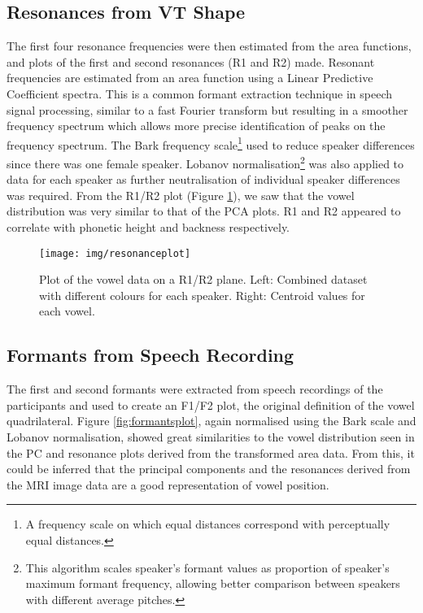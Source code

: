 \subsection{Resonances from VT Shape}

The first four resonance frequencies were then estimated from the area functions, and plots of the first and second resonances (R1 and R2) made. Resonant frequencies are estimated from an area function using a Linear Predictive Coefficient spectra. This is a common formant extraction technique in speech signal processing, similar to a fast Fourier transform but resulting in a smoother frequency spectrum which allows more precise identification of peaks on the frequency spectrum. The Bark frequency scale\footnote{A frequency scale on which equal distances correspond with perceptually equal distances.} used to reduce speaker differences since there was one female speaker. Lobanov normalisation\footnote{This algorithm scales speaker’s formant values as proportion of speaker’s maximum formant frequency, allowing better comparison between speakers with different average pitches.} was also applied to data for each speaker as further neutralisation of individual speaker differences was required. From the R1/R2 plot (Figure \ref{fig:resonanceplot}), we saw that the vowel distribution was very similar to that of the PCA plots. R1 and R2 appeared to correlate with phonetic height and backness respectively.

\begin{figure}[H]
\centering
\texttt{[image: img/resonanceplot]}
\caption{Plot of the vowel data on a R1/R2 plane. Left: Combined dataset with different colours for each speaker. Right: Centroid values for each vowel.}
\label{fig:resonanceplot}
\end{figure}

\subsection{Formants from Speech Recording}

The first and second formants were extracted from speech recordings of the participants and used to create an F1/F2 plot, the original definition of the vowel quadrilateral. Figure \ref{fig:formantsplot}, again normalised using the Bark scale and Lobanov normalisation, showed great similarities to the vowel distribution seen in the PC and resonance plots derived from the transformed area data. From this, it could be inferred that the principal components and the resonances derived from the MRI image data are a good representation of vowel position.


